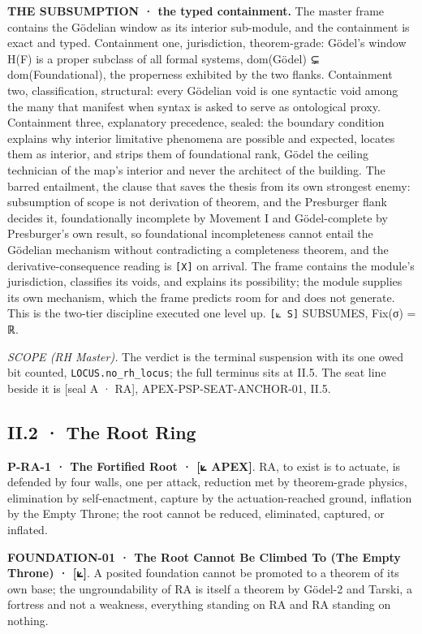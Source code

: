 \documentclass[10pt,twocolumn]{article}
\begin{document}
\textbf{THE SUBSUMPTION · the typed containment.} The master frame
contains the Gödelian window as its interior sub-module, and the
containment is exact and typed. Containment one, jurisdiction,
theorem-grade: Gödel's window H(F) is a proper subclass of all formal
systems, dom(Gödel) ⊊ dom(Foundational), the properness exhibited by the
two flanks. Containment two, classification, structural: every Gödelian
void is one syntactic void among the many that manifest when syntax is
asked to serve as ontological proxy. Containment three, explanatory
precedence, sealed: the boundary condition explains why interior
limitative phenomena are possible and expected, locates them as
interior, and strips them of foundational rank, Gödel the ceiling
technician of the map's interior and never the architect of the
building. The barred entailment, the clause that saves the thesis from
its own strongest enemy: subsumption of scope is not derivation of
theorem, and the Presburger flank decides it, foundationally incomplete
by Movement I and Gödel-complete by Presburger's own result, so
foundational incompleteness cannot entail the Gödelian mechanism without
contradicting a completeness theorem, and the derivative-consequence
reading is \texttt{{[}X{]}} on arrival. The frame contains the module's
jurisdiction, classifies its voids, and explains its possibility; the
module supplies its own mechanism, which the frame predicts room for and
does not generate. This is the two-tier discipline executed one level
up. \texttt{{[}⟀\ S{]}} SUBSUMES, Fix(σ) = ℝ.

\emph{SCOPE (RH Master).} The verdict is the terminal suspension with
its one owed bit counted, \texttt{LOCUS.no\_rh\_locus}; the full
terminus sits at II.5. The seat line beside it is {[}seal A · RA{]},
APEX-PSP-SEAT-ANCHOR-01, II.5.

\hypertarget{ii.2-the-root-ring}{%
\subsection{II.2 · The Root Ring}\label{ii.2-the-root-ring}}

\textbf{P-RA-1 · The Fortified Root · {[}⟀ APEX{]}}. RA, to exist is to
actuate, is defended by four walls, one per attack, reduction met by
theorem-grade physics, elimination by self-enactment, capture by the
actuation-reached ground, inflation by the Empty Throne; the root cannot
be reduced, eliminated, captured, or inflated.

\textbf{FOUNDATION-01 · The Root Cannot Be Climbed To (The Empty Throne)
· {[}⟀{]}}. A posited foundation cannot be promoted to a theorem of its
own base; the ungroundability of RA is itself a theorem by Gödel-2 and
Tarski, a fortress and not a weakness, everything standing on RA and RA
standing on nothing.
\end{document}
